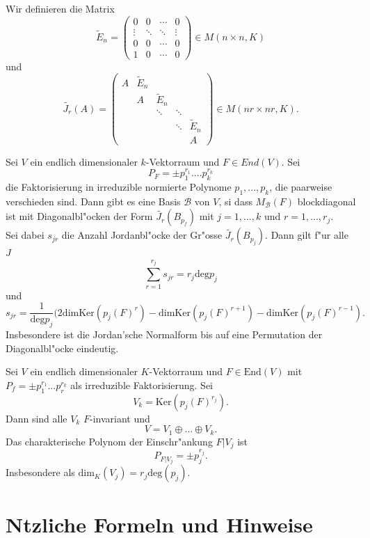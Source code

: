 \documentclass[11pt, a4paper]{article}
\begin{document}
 \begin{definition}
 Wir definieren die Matrix
 $$
 \tilde{E}_n =
\left(\begin{array}{cccc}0 & 0 & \cdots & 0 \\ \vdots & \ddots & \ddots & \vdots \\ 0 & 0 & \cdots & 0 \\ 1 & 0 & \cdots & 0\end{array}\right) \in M(n \times n, K)
 $$
 und 
 $$
 \tilde{J_r}(A)
=\left(\begin{array}{ccccc}A & \tilde{E}_{n} & & & \\ & A & \tilde{E}_{n} & & \\ & & \ddots & \ddots & \\ & & & \ddots & \tilde{E}_{n} \\ & & & & A\end{array}\right) \in M(n r \times n r, K).
 $$
 \end{definition}
 
 
 \begin{theorem}
 Sei $V$ ein endlich dimensionaler $k$-Vektorraum und $F \in End(V)$. Sei
 $$
 P_F = \pm p_1^{r_1} .... p_k^{r_k}
 $$
 die Faktorisierung in irreduzible normierte Polynome $p_1, ..., p_k$, die paarweise verschieden sind. Dann gibt es eine Basis $\mathcal{B}$ von $V$, si dass $M_\mathcal{B}(F)$ blockdiagonal ist mit Diagonalbl"ocken der Form $\tilde{J_r}(B_{p_f})$ mit $j = 1, ..., k$ und $r = 1, ..., r_j$.
 \\ Sei dabei $s_{jr}$ die Anzahl Jordanbl"ocke der Gr"osse $\tilde{J_r}(B_{p_j})$. 
 Dann gilt f"ur alle $J$
 $$
 \sum\limits_{r = 1}^{r_j} s_{jr} = r_j \mathrm{deg} p_j
 $$
 und 
 $$
 s_{jr} = \frac{1}{\mathrm{deg}  p_j}(2 \mathrm{dim} \mathrm{Ker} (p_j(F)^r) -\mathrm{dim} \mathrm{Ker}(p_j(F)^{r+1}) - \mathrm{dim} \mathrm{Ker}(p_j(F)^{r-1}).
 $$
 Insbesondere ist die Jordan'sche Normalform bis auf eine Permutation der Diagonalbl"ocke eindeutig.
  
 \end{theorem}
 
 \begin{theorem}
 Sei $V$ ein endlich dimensionaler $K$-Vektorraum und $F \in \mathrm{End}(V)$ mit $P_f = \pm p_1^{r_1} ... p_r^{r_k}$ als irreduzible Faktorisierung. Sei 
 $$
 V_k = \mathrm{Ker}(p_j(F)^{r_j}).
 $$
 Dann sind alle $V_k$ $F$-invariant und
 $$
 V = V_1 \oplus ... \oplus V_k.
 $$
 Das charakterische Polynom der Einschr"ankung $F|V_j$ ist
 $$
 P_{F|V_j} = \pm p_j^{r_j}.
 $$
 Insbesondere als $\mathrm{dim}_K(V_j) = r_j \mathrm{deg}(p_j)$.
 \end{theorem}
 
 
 
 
\section{N\uee tzliche Formeln und Hinweise}
\end{document}

